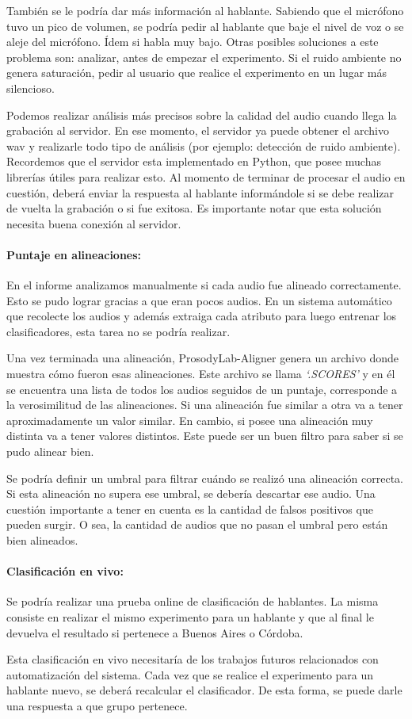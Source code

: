 También se le podría dar más información al hablante. Sabiendo que el micrófono tuvo un pico de volumen, se podría pedir al hablante que baje el nivel de voz o se aleje del micrófono. Ídem si habla muy bajo. Otras posibles soluciones a este problema son: analizar, antes de empezar el experimento. Si el ruido ambiente no genera saturación, pedir al usuario que realice el experimento en un lugar más silencioso. 

Podemos realizar análisis más precisos sobre la calidad del audio cuando llega la grabación al servidor. En ese momento, el servidor ya puede obtener el archivo wav y realizarle todo tipo de análisis (por ejemplo: detección de ruido ambiente). Recordemos que el servidor esta implementado en Python, que posee muchas librerías útiles para realizar esto. Al momento de terminar de procesar el audio en cuestión, deberá enviar la respuesta al hablante informándole si se debe realizar de vuelta la grabación o si fue exitosa. Es importante notar que esta solución necesita buena conexión al servidor. 

\paragraph*{Puntaje en alineaciones:} En el informe analizamos manualmente si cada audio fue alineado correctamente. Esto se pudo lograr gracias a que eran pocos audios. En un sistema automático que recolecte los audios y además extraiga cada atributo para luego entrenar los clasificadores, esta tarea no se podría realizar.     

Una vez terminada una alineación, ProsodyLab-Aligner genera un archivo donde muestra cómo fueron esas alineaciones. Este archivo se llama \textit{`.SCORES’} y en él se encuentra una lista de todos los audios seguidos de un puntaje, corresponde a la verosimilitud de las alineaciones. Si una alineación fue similar a otra va a tener aproximadamente un valor similar. En cambio, si posee una alineación muy distinta va a tener valores distintos. Este puede ser un buen filtro para saber si se pudo alinear bien.

Se podría definir un umbral para filtrar cuándo se realizó una alineación correcta. Si esta alineación no supera ese umbral, se debería descartar ese audio. Una cuestión importante a tener en cuenta es la cantidad de falsos positivos que pueden surgir. O sea, la cantidad de audios que no pasan el umbral pero están bien alineados.   

\paragraph*{Clasificación en vivo:} Se podría realizar una prueba online de clasificación de hablantes. La misma consiste en realizar el mismo experimento para un hablante y que al final le devuelva el resultado si pertenece a Buenos Aires o Córdoba.

Esta clasificación en vivo necesitaría de los trabajos futuros relacionados con automatización del sistema. Cada vez que se realice el experimento para un hablante nuevo, se deberá recalcular el clasificador. De esta forma, se puede darle una respuesta a que grupo pertenece.